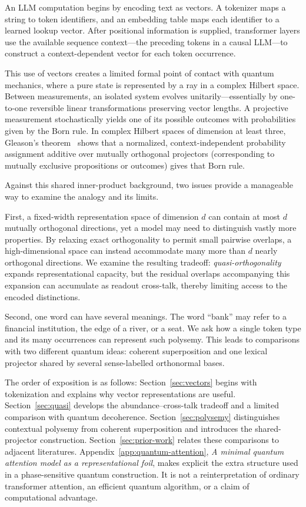 \documentclass[
  aps,
  reprint,
  superscriptaddress,
  floatfix,
  nofootinbib,
  longbibliography
]{revtex4-2}
\begin{document}
An LLM computation begins by encoding text as vectors.  A tokenizer maps a
string to token identifiers, and an embedding table maps each identifier to a
learned lookup vector.  After positional information is supplied, transformer
layers use the available sequence context---the preceding tokens in a causal
LLM---to construct a context-dependent vector for each token occurrence.

This use of vectors creates a limited formal point of contact with quantum mechanics,
where a pure state is represented by a ray in a complex Hilbert space.
Between measurements, an isolated system evolves unitarily---essentially by one-to-one
reversible linear transformations preserving vector lengths.
A projective measurement stochastically yields one of its possible outcomes
with probabilities given by the Born rule.
In complex Hilbert spaces of dimension at least three, Gleason's theorem~\cite{Gleason,Wright2019}
shows that a normalized, context-independent probability assignment additive over mutually orthogonal projectors
(corresponding to mutually exclusive propositions or outcomes) gives that Born rule.

Against this shared inner-product background, two issues provide a manageable
way to examine the analogy and its limits.

First, a fixed-width representation space of dimension $d$ can contain at
most $d$ mutually orthogonal directions, yet a model may need to distinguish
vastly more properties. By relaxing exact orthogonality to permit small
pairwise overlaps, a high-dimensional space can instead accommodate many more
than $d$ nearly orthogonal directions. We examine the resulting tradeoff:
\emph{quasi-orthogonality} expands representational capacity, but the residual
overlaps accompanying this expansion can accumulate as readout cross-talk,
thereby limiting access to the encoded distinctions.

Second, one word can have several meanings.  The word ``bank'' may refer to a
financial institution, the edge of a river, or a seat.  We ask how a single
token type and its many occurrences can represent such polysemy.  This leads
to comparisons with two different quantum ideas: coherent superposition and
one lexical projector shared by several sense-labelled orthonormal bases.


The order of exposition is as follows:  Section~\ref{sec:vectors} begins
with tokenization and explains why vector representations are useful.
Section~\ref{sec:quasi} develops the abundance--cross-talk tradeoff and a
limited comparison with quantum decoherence.  Section~\ref{sec:polysemy}
distinguishes contextual polysemy from coherent superposition and introduces
the shared-projector construction.  Section~\ref{sec:prior-work} relates these
comparisons to adjacent literatures.  Appendix~\ref{app:quantum-attention},
\emph{A minimal quantum attention model as a representational foil}, makes explicit the extra
structure used in a phase-sensitive quantum construction.  It is not a
reinterpretation of ordinary transformer attention, an efficient quantum
algorithm, or a claim of computational advantage.
\end{document}
